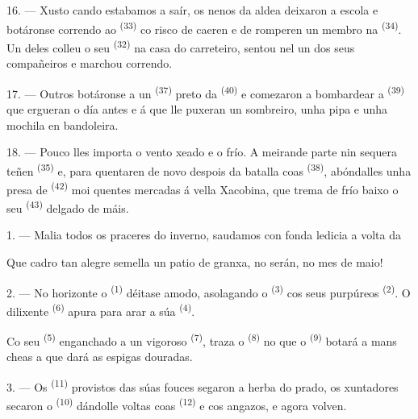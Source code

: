 16. --- Xusto cando estabamos a saír, os nenos da aldea deixaron a escola e botáronse correndo
ao  \textsuperscript{(33)} co risco de caeren e de romperen un membro
na  \textsuperscript{(34)}. Un deles colleu o seu
 \textsuperscript{(32)} na casa do carreteiro, sentou nel un dos seus
compañeiros e marchou correndo.

17. --- Outros botáronse a un  \textsuperscript{(37)} preto da
 \textsuperscript{(40)} e comezaron a bombardear a  \textsuperscript{(39)} que ergueran o día antes e á que lle puxeran un sombreiro, unha
pipa e unha mochila en bandoleira.

18. --- Pouco lles importa o vento xeado e o frío. A meirande parte nin sequera teñen
 \textsuperscript{(35)} e, para quentaren de novo despois da batalla
coas  \textsuperscript{(38)}, abóndalles unha presa de
 \textsuperscript{(42)} moi quentes mercadas á vella
 Xacobina, que trema de frío baixo o seu 
\textsuperscript{(43)} delgado de máis.

\VUsaut{3.0mm}
\VUsaut{3.0mm}

\VUsaut{4.0mm}

1. --- Malia todos os praceres do inverno, saudamos con fonda ledicia a volta da

Que cadro tan alegre semella un patio de granxa, no serán, no mes de maio!

2. --- No horizonte o  \textsuperscript{(1)} déitase amodo, asolagando o
 \textsuperscript{(3)} cos seus  purpúreos
\textsuperscript{(2)}. O dilixente  \textsuperscript{(6)} apura para arar a
súa  \textsuperscript{(4)}.

Co seu  \textsuperscript{(5)} enganchado a un vigoroso 
\textsuperscript{(7)}, traza o  \textsuperscript{(8)} no que o
 \textsuperscript{(9)} botará a mans cheas a  que
dará as espigas douradas.

3. --- Os  \textsuperscript{(11)} provistos das súas fouces segaron a herba
do prado, os xuntadores secaron o  \textsuperscript{(10)} dándolle voltas coas
 \textsuperscript{(12)} e cos angazos, e agora volven.

